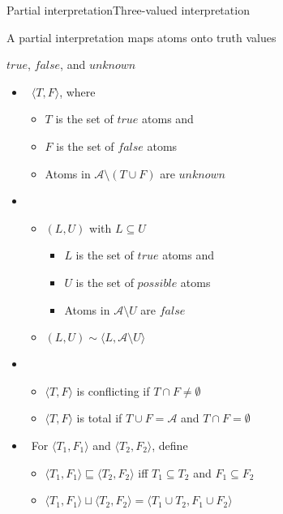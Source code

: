 \begin{frame}{Partial interpretation}{Three-valued interpretation}

  A \alert{partial interpretation} maps atoms onto truth values
  \par
  \alert{$\mathit{true}$}, \alert{$\mathit{false}$}, and \alert{$\mathit{unknown}$}
  \smallskip
  \begin{itemize}
  \item<2->  \ $\langle T,F \rangle$, where
    \begin{itemize}\normalsize
    \item $T$ is the set of $\mathit{true}$  atoms and
    \item $F$ is the set of $\mathit{false}$ atoms
    \item Atoms in $\mathcal{A} \setminus (T \cup F)$ are $\mathit{unknown}$
    \end{itemize}
    \smallskip
  \item<only@3>  \
    \begin{itemize}\normalsize
    \item $(L,U)$ with $L\subseteq U$
      \begin{itemize}\small
      \item $L$ is the set of $\mathit{true}$  atoms and
      \item $U$ is the set of $\mathit{possible}$ atoms
      \item Atoms in $\mathcal{A} \setminus U$ are $\mathit{false}$
      \end{itemize}
    \item $(L,U)\sim \langle L,\mathcal{A}\setminus U\rangle$
    \end{itemize}
  \item<only@4-> 
    \begin{itemize}\normalsize
    \item $\langle T,F \rangle$ is \alert{conflicting} if $T \cap F\neq\emptyset$
    \item $\langle T,F \rangle$ is \alert{total} if $T \cup F = \mathcal{A}$ and $T \cap F=\emptyset$
    \end{itemize}
    \smallskip
  \item<only@5->  \
    For $\langle T_1,F_1\rangle$ and $\langle T_2,F_2\rangle$, define
    \begin{itemize}\normalsize
    \item $\langle T_1,F_1\rangle \sqsubseteq \langle T_2,F_2\rangle$
      iff
      $T_1\subseteq T_2$ and $F_1\subseteq F_2$
    \item $\langle T_1,F_1\rangle \sqcup \langle T_2,F_2\rangle =
      \langle T_1 \cup T_2, F_1 \cup F_2 \rangle$
    \end{itemize}
  \end{itemize}
\end{frame}
%
